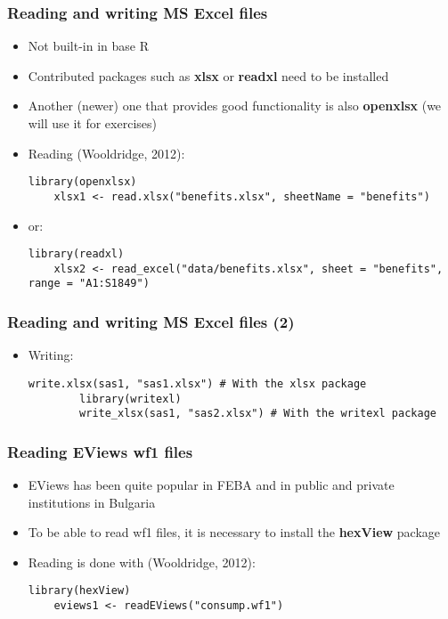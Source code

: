 \documentclass[10pt]{beamer}
\theoremstyle{definition}
\begin{document}
\begin{frame}[fragile]
\frametitle{Reading and writing MS Excel files}
\begin{itemize}
	\item Not built-in in base R
	\item Contributed packages such as \textbf{xlsx} or \textbf{readxl} need to be installed
	\item Another (newer) one that provides good functionality is also \textbf{openxlsx} (we will use it for exercises)
	\item Reading (Wooldridge, 2012):
	\begin{lstlisting}[style = rstyle, breaklines]
	library(openxlsx)
	xlsx1 <- read.xlsx("benefits.xlsx", sheetName = "benefits")
	\end{lstlisting}
	\item or:
	\begin{lstlisting}[style = rstyle, breaklines]
	library(readxl)
	xlsx2 <- read_excel("data/benefits.xlsx", sheet = "benefits", range = "A1:S1849")
	\end{lstlisting}
\end{itemize}
\end{frame}

\begin{frame}[fragile]
	\frametitle{Reading and writing MS Excel files (2)}
	\begin{itemize}
		\item Writing:
		\begin{lstlisting}[style = rstyle, breaklines]
		write.xlsx(sas1, "sas1.xlsx") # With the xlsx package
		library(writexl)
		write_xlsx(sas1, "sas2.xlsx") # With the writexl package
		\end{lstlisting} 
	\end{itemize}
\end{frame}

\begin{frame}[fragile]
\frametitle{Reading EViews wf1 files}
\begin{itemize}
	\item EViews has been quite popular in FEBA and in public and private institutions in Bulgaria
	\item To be able to read wf1 files, it is necessary to install the \textbf{hexView} package
	\item Reading is done with (Wooldridge, 2012):
	\begin{lstlisting}[style = rstyle, breaklines]
	library(hexView)
	eviews1 <- readEViews("consump.wf1")
	\end{lstlisting}
\end{itemize}
\end{frame}
\end{document}
